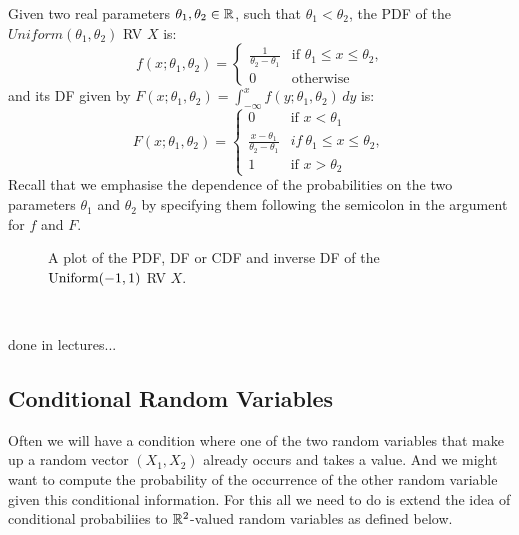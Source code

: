 \begin{model}\label{M:Uniformab}
Given two real parameters $\theta_1,\theta_2 \in \mathbb{R}$, such that $\theta_1 < \theta_2$, the PDF of the $Uniform(\theta_1,\theta_2)$ RV $X$ is:
\begin{equation}\label{E:Uniformabpdf}
f(x;\theta_1,\theta_2) =
\begin{cases}
\frac{1}{\theta_2 - \theta_1} & \text{if $\theta_1 \leq x \leq \theta_2$,}\\
0 & \text{otherwise}
\end{cases}
\end{equation}
and its DF given by $F(x;\theta_1,\theta_2) = \int_{- \infty}^x f(y; \theta_1,\theta_2) \, dy$ is:
\begin{equation}\label{E:Uniformabcdf}
F(x; \theta_1,\theta_2) =
\begin{cases}
0 & \text{if $x < \theta_1$} \\
\frac{x-\theta_1}{\theta_2-\theta_1} & if~\theta_1 \leq x \leq \theta_2,\\
1 & \text{if $x > \theta_2$}
\end{cases}
\end{equation}
Recall that we emphasise the dependence of the probabilities on the two parameters $\theta_1$ and $\theta_2$ by specifying them following the semicolon in the argument for $f$ and $F$.
\end{model}
\begin{figure}[htpb]
\caption{A plot of the PDF, DF or CDF and inverse DF of the $\mbox{{\rm Uniform}}(-1,1)$ RV $X$.\label{F:unifpm1}}
\centering   {}
\end{figure}
\begin{example}
~

done in lectures...
\vspace{5cm}

\end{example}

\subsection{Conditional Random Variables}

Often we will have a condition where one of the two random variables that make up a random vector $(X_1,X_2)$ already occurs and takes a value. 
And we might want to compute the probability of the occurrence of the other random variable given this conditional information.
For this all we need to do is extend the idea of conditional probabiliies to $\mathbb{R}^2$-valued random variables as defined below.

